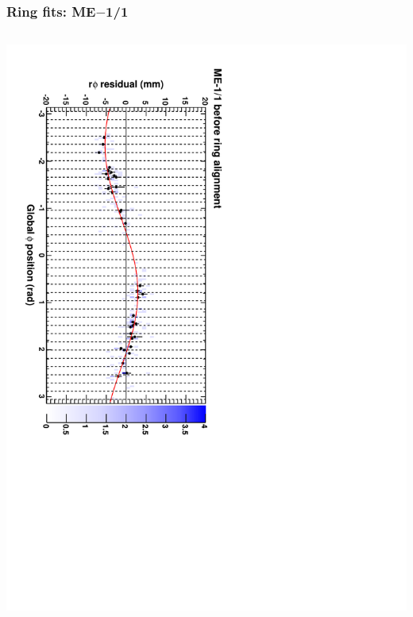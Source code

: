 \documentclass[compress]{beamer}
\begin{document}
\begin{frame}
\frametitle{Ring fits: ME$-$1/1}
\vfill
\begin{columns}
\includegraphics[height=\linewidth, angle=90]{ringfits_before/mem11.pdf}


\end{columns}
\end{frame}
\end{document}
